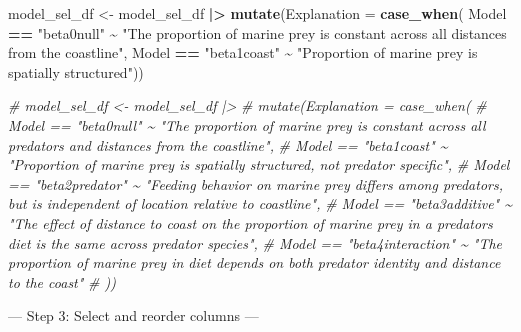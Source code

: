 \documentclass[
]{article}
\newenvironment{Shaded}{\begin{snugshade}}{\end{snugshade}}
\newcommand{\AttributeTok}[1]{\textcolor[rgb]{0.13,0.29,0.53}{#1}}
\newcommand{\CommentTok}[1]{\textcolor[rgb]{0.56,0.35,0.01}{\textit{#1}}}
\newcommand{\FunctionTok}[1]{\textcolor[rgb]{0.13,0.29,0.53}{\textbf{#1}}}
\newcommand{\NormalTok}[1]{#1}
\newcommand{\OtherTok}[1]{\textcolor[rgb]{0.56,0.35,0.01}{#1}}
\newcommand{\SpecialCharTok}[1]{\textcolor[rgb]{0.81,0.36,0.00}{\textbf{#1}}}
\newcommand{\StringTok}[1]{\textcolor[rgb]{0.31,0.60,0.02}{#1}}
\begin{document}
\begin{Shaded}
\begin{Highlighting}[]
\NormalTok{model\_sel\_df }\OtherTok{\textless{}{-}}\NormalTok{ model\_sel\_df }\SpecialCharTok{|\textgreater{}} 
  \FunctionTok{mutate}\NormalTok{(}\AttributeTok{Explanation =} \FunctionTok{case\_when}\NormalTok{(}
\NormalTok{  Model }\SpecialCharTok{==} \StringTok{"beta0null"} \SpecialCharTok{\textasciitilde{}} \StringTok{"The proportion of marine prey is constant across all distances from the coastline"}\NormalTok{,}
\NormalTok{  Model }\SpecialCharTok{==} \StringTok{"beta1coast"} \SpecialCharTok{\textasciitilde{}} \StringTok{"Proportion of marine prey is spatially structured"}\NormalTok{))}

\CommentTok{\# model\_sel\_df \textless{}{-} model\_sel\_df |\textgreater{} }
\CommentTok{\#   mutate(Explanation = case\_when(}
\CommentTok{\#   Model == "beta0null" \textasciitilde{} "The proportion of marine prey is constant across all predators and distances from the coastline",}
\CommentTok{\#   Model == "beta1coast" \textasciitilde{} "Proportion of marine prey is spatially structured, not predator specific",}
\CommentTok{\#   Model == "beta2predator" \textasciitilde{} "Feeding behavior on marine prey differs among predators, but is independent of location relative to coastline",}
\CommentTok{\#   Model == "beta3additive" \textasciitilde{} "The effect of distance to coast on the proportion of marine prey in a predator\textquotesingle{}s diet is the same across predator species",}
\CommentTok{\#   Model == "beta4interaction" \textasciitilde{} "The proportion of marine prey in diet depends on both predator identity and distance to the coast"}
\CommentTok{\# ))}
\end{Highlighting}
\end{Shaded}

--- Step 3: Select and reorder columns ---
\end{document}
